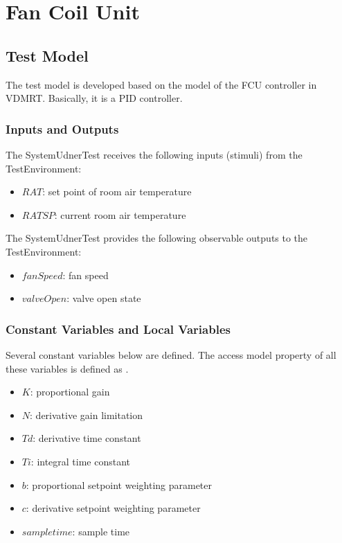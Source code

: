 \graphicspath{ {fcu/} }

\section{Fan Coil Unit}

\subsection{Test Model}
The test model is developed based on the model of the FCU controller in VDMRT. Basically, it is a PID controller.

\subsubsection{Inputs and Outputs}
The SystemUdnerTest receives the following inputs (stimuli) from the TestEnvironment:
\begin{itemize}
    \item $RAT$: set point of room air temperature 
    \item $RATSP$: current room air temperature 
\end{itemize}

The SystemUdnerTest provides the following observable outputs to the TestEnvironment:
\begin{itemize}
    \item $fanSpeed$: fan speed  
    \item $valveOpen$: valve open state 
\end{itemize}

\subsubsection{Constant Variables and Local Variables}
Several constant variables below are defined. The access model property of all these variables is defined as .  
\begin{itemize}
	\item $K$: proportional gain
	\item $N$: derivative gain limitation
	\item $Td$: derivative time constant 
	\item $Ti$: integral time constant 
	\item $b$: proportional setpoint weighting parameter
	\item $c$: derivative setpoint weighting parameter 
    \item $sampletime$: sample time 
\end{itemize}

